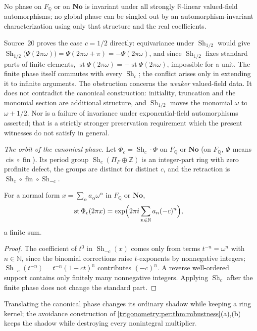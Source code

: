 \documentclass[11pt,letterpaper]{article}
\numberwithin{equation}{section}
\theoremstyle{definition}
\theoremstyle{remark}
\newcommand{\No}{\mathbf{No}}
\newcommand{\R}{\mathbb R}
\newcommand{\Q}{\mathbb Q}
\newcommand{\Z}{\mathbb Z}
\newcommand{\N}{\mathbb N}
\newcommand{\st}{\operatorname{st}}
\newcommand{\fin}{\operatorname{fin}}
\newcommand{\cis}{\operatorname{cis}}
\newcommand{\Sh}{\operatorname{Sh}}
\begin{document}
\begin{corollary}\label{trigonometry:per:cor:naturality}
No phase on $F_{\Q}$ or on $\No$ is invariant under all strongly $\R$-linear valued-field
automorphisms; no global phase can be singled out by an automorphism-invariant characterization using
only that structure and the real coefficients.
\end{corollary}

\begin{remark}\label{trigonometry:per:rem:halfshift}
Source~20 proves the case $c=1/2$ directly: equivariance under $\Sh_{1/2}$ would give
$\Sh_{1/2}\bigl(\Psi(2\pi\omega)\bigr)=\Psi(2\pi\omega+\pi)=-\Psi(2\pi\omega)$, and since $\Sh_{1/2}$
fixes standard parts of finite elements, $\st\Psi(2\pi\omega)=-\st\Psi(2\pi\omega)$, impossible for a
unit. The finite phase itself commutes with every $\Sh_c$;
the conflict arises only in extending it to infinite arguments. The obstruction concerns the
\emph{weaker} valued-field data. It does not contradict the canonical construction: initiality,
truncation and the monomial section are additional structure, and $\Sh_{1/2}$ moves the monomial
$\omega$ to $\omega+1/2$. Nor is a failure of invariance under exponential-field automorphisms
asserted; that is a strictly stronger preservation requirement which the present witnesses do not
satisfy in general.
\end{remark}

\emph{The orbit of the canonical phase.} Let $\Phi_c=\Sh_c\cdot\Phi$ on $F_{\Q}$ or $\No$ (on $F_{\Q}$,
$\Phi$ means $\cis\circ\fin$). Its period group $\Sh_c(\Pi_F\oplus\Z)$ is an integer-part ring with
zero profinite defect, the groups are distinct for distinct $c$, and the retraction is
$\Sh_c\circ\fin\circ\Sh_{-c}$.

\begin{proposition}\label{trigonometry:per:prop:shadow}
For a normal form $x=\sum_\alpha a_\alpha\omega^\alpha$ in $F_{\Q}$ or $\No$,
\[
 \st\Phi_c(2\pi x)=\exp\Bigl(2\pi i\sum_{n\in\N}a_n(-c)^n\Bigr),
\]
a finite sum.
\end{proposition}
\begin{proof}
The coefficient of $t^0$ in $\Sh_{-c}(x)$ comes only from terms $t^{-n}=\omega^n$ with $n\in\N$, since
the binomial corrections raise $t$-exponents by nonnegative integers; $\Sh_{-c}(t^{-n})=t^{-n}(1-ct)^n$
contributes $(-c)^n$. A reverse well-ordered support contains only finitely many nonnegative
integers. Applying $\Sh_c$ after the finite phase does not change the standard part.
\end{proof}
Translating the canonical phase changes its ordinary shadow while keeping a ring kernel; the avoidance
construction of \cref{trigonometry:per:thm:robustness}(a),(b) keeps the shadow while destroying every
nonintegral multiplier.
\end{document}
